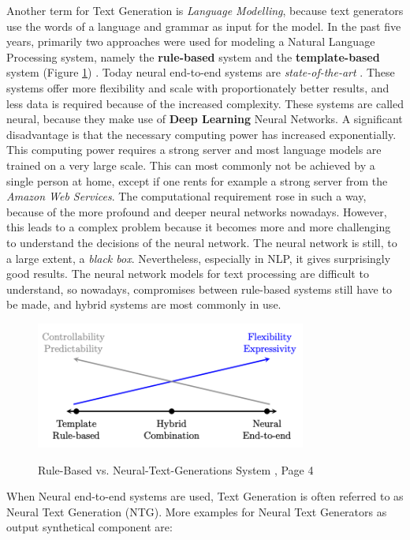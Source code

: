 Another term for Text Generation is  \textit{Language Modelling}, because text generators use the words of a language and grammar as input for the model. In the past five years, primarily two approaches were used for modeling a Natural Language Processing system, namely the \textbf{rule-based} system and the \textbf{template-based} system (Figure \ref{rules_based}) \cite{NTG2}. Today neural end-to-end systems are \textit{state-of-the-art} \cite{End_to_End}. These systems offer more flexibility and scale with proportionately better results, and less data is required because of the increased complexity. These systems are called neural, because they make use of \textbf{Deep Learning} Neural Networks.
A significant disadvantage is that the necessary computing power has increased exponentially. This computing power requires a strong server and most language models are trained on a very large scale. This can most commonly not be achieved by a single person at home, except if one rents for example a strong server from the \textit{Amazon Web Services}. The computational requirement rose in such a way, because of the more profound and deeper neural networks nowadays. However, this leads to a complex problem because it becomes more and more challenging to understand the decisions of the neural network. The neural network is still, to a large extent, a \textit{black box}. Nevertheless, especially in NLP, it gives surprisingly good results. The neural network models for text processing are difficult to understand, so nowadays, compromises between rule-based systems still have to be made, and hybrid systems are most commonly in use. 


\begin{figure}
  \begin{center}
  \includegraphics[width=3.5in]{photos/rule_based}\\
  \caption{Rule-Based vs. Neural-Text-Generations System \cite{NTG2}, Page 4}\label{rules_based}
  \end{center}
\end{figure}

When Neural end-to-end systems are used, Text Generation is often referred to as Neural Text Generation (NTG). More examples for Neural Text Generators as output synthetical component are:

